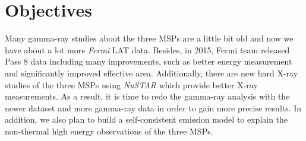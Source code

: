 \documentclass[a4paper, 12pt]{report}
\begin{document}
    
    \begin{table}[!htp]
      \centering
      \vspace{0.5cm}
        \centering
        \caption[Spectra properties of the three MSPs from previous studies.]
          {Spectra properties of the three MSPs from previous studies
          \footnote{http://www.atnf.csiro.au/research/pulsar/psrcat/}
          \cite{0004-637X-787-2-167,J1939_old}.}
        \label{table: previous_spectra_property}
    \end{table}

  \section{Objectives}
    
    Many gamma-ray studies about the three MSPs are a little bit old and now we have about 
    a lot more \textit{Fermi} LAT data. Besides, in 2015, Fermi team released Pass 8 data 
    including many improvements, such as better energy measurement and significantly 
    improved effective area. Additionally, there are new hard X-ray studies of the three 
    MSPs using \textit{NuSTAR} which provide better X-ray measurements.
    As a result, it is time to redo the gamma-ray analysis with the newer dataset and
    more gamma-ray data in order to gain more precise results. In addition, we also plan to 
    build a self-consistent emission model to explain the non-thermal high energy
    observations of the three MSPs. 
\end{document}
